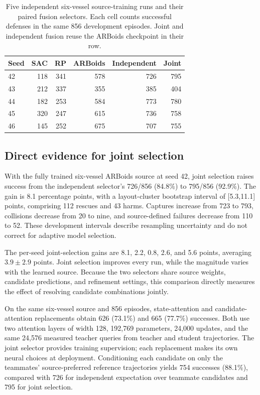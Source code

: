 \documentclass[journal]{IEEEtran}
\begin{document}
\begin{table}[t]
\caption{Five independent six-vessel source-training runs and their paired fusion selectors. Each cell counts successful defenses in the same 856 development episodes. Joint and independent fusion reuse the ARBoids checkpoint in their row.}
\label{tab:source-repeats}\centering\small
\begin{tabular}{@{}lrrrrr@{}}\toprule
Seed & SAC & RP & ARBoids & Independent & Joint\\\midrule
42 & 118 & 341 & 578 & 726 & 795\\
43 & 212 & 337 & 355 & 385 & 404\\
44 & 182 & 253 & 584 & 773 & 780\\
45 & 320 & 247 & 615 & 736 & 758\\
46 & 145 & 252 & 675 & 707 & 755\\\bottomrule
\end{tabular}
\end{table}

\subsection{Direct evidence for joint selection}
With the fully trained six-vessel ARBoids source at seed 42, joint selection raises success from the independent selector's 726/856 (84.8\%) to 795/856 (92.9\%). The gain is 8.1 percentage points, with a layout-cluster bootstrap interval of [5.3,11.1] points, comprising 112 rescues and 43 harms. Captures increase from 723 to 793, collisions decrease from 20 to nine, and source-defined failures decrease from 110 to 52. These development intervals describe resampling uncertainty and do not correct for adaptive model selection.

The per-seed joint-selection gains are 8.1, 2.2, 0.8, 2.6, and 5.6 points, averaging $3.9\pm2.9$ points. Joint selection improves every run, while the magnitude varies with the learned source. Because the two selectors share source weights, candidate predictions, and refinement settings, this comparison directly measures the effect of resolving candidate combinations jointly.

On the same six-vessel source and 856 episodes, state-attention and candidate-attention replacements obtain 626 (73.1\%) and 665 (77.7\%) successes. Both use two attention layers of width 128, 192,769 parameters, 24,000 updates, and the same 24,576 measured teacher queries from teacher and student trajectories. The joint selector provides training supervision; each replacement makes its own neural choices at deployment. Conditioning each candidate on only the teammates' source-preferred reference trajectories yields 754 successes (88.1\%), compared with 726 for independent expectation over teammate candidates and 795 for joint selection.
\end{document}
